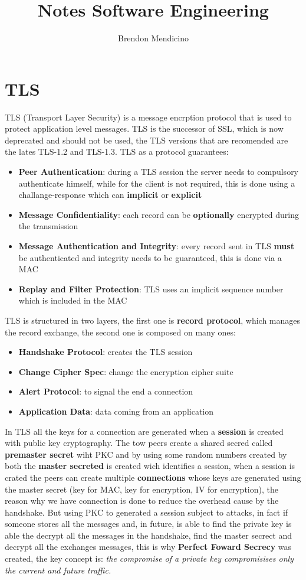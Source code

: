 \documentclass[12pt]{article}
\title{Notes Software Engineering}
\author{Brendon Mendicino}
\begin{document}
\maketitle
\newpage
\tableofcontents

\newpage
\section{TLS}
TLS (Transport Layer Security) is a message encrption protocol that is used to protect application level messages. TLS is the successor of SSL, which is now deprecated and should not be used, the TLS versions that are recomended are the lates TLS-1.2 and TLS-1.3. TLS as a protocol guarantees:
\begin{itemize}
  \item \textbf{Peer Authentication}: during a TLS session the server needs to compulsory authenticate himself, while for the client is not required, this is done using a challange-response which can \textbf{implicit} or \textbf{explicit}
  \item \textbf{Message Confidentiality}: each record can be \textbf{optionally} encrypted during the transmission
  \item \textbf{Message Authentication and Integrity}: every record sent in TLS \textbf{must} be authenticated and integrity needs to be guaranteed, this is done via a MAC
  \item \textbf{Replay and Filter Protection}: TLS uses an implicit sequence number which is included in the MAC
\end{itemize}
TLS is structured in two layers, the first one is \textbf{record protocol}, which manages the record exchange, the second one is composed on many ones:
\begin{itemize}
  \item \textbf{Handshake Protocol}: creates the TLS session
  \item \textbf{Change Cipher Spec}: change the encryption cipher suite 
  \item \textbf{Alert Protocol}: to signal the end a connection 
  \item \textbf{Application Data}: data coming from an application
\end{itemize}
In TLS all the keys for a connection are generated when a \textbf{session} is created with public key cryptography. The tow peers create a shared secred called \textbf{premaster secret} wiht PKC and by using some random numbers created by both the \textbf{master secreted} is created wich identifies a session, when a session is crated the peers can create multiple \textbf{connections} whose keys are generated using the master secret (key for MAC, key for encryption, IV for encryption), the reason why we have connection is done to reduce the overhead cause by the handshake. But using PKC to generated a session subject to attacks, in fact if someone stores all the messages and, in future, is able to find the private key is able the decrypt all the messages in the handshake, find the master secrect and decrypt all the exchanges messages, this is why \textbf{Perfect Foward Secrecy} was created, the key concept is: \textit{the compromise of a private key compromisises only the current and future traffic.}
\end{document}
